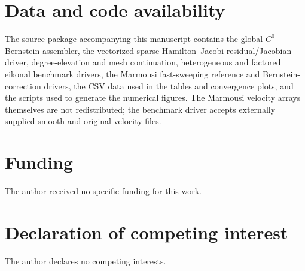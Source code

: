 \documentclass[preprint,12pt]{elsarticle}
\begin{document}
\section*{Data and code availability}
The source package accompanying this manuscript contains the global $C^0$ Bernstein assembler, the vectorized sparse Hamilton--Jacobi residual/Jacobian driver, degree-elevation and mesh continuation, heterogeneous and factored eikonal benchmark drivers, the Marmousi fast-sweeping reference and Bernstein-correction drivers, the CSV data used in the tables and convergence plots, and the scripts used to generate the numerical figures.  The Marmousi velocity arrays themselves are not redistributed; the benchmark driver accepts externally supplied smooth and original velocity files.

\section*{Funding}
The author received no specific funding for this work.

\section*{Declaration of competing interest}
The author declares no competing interests.
\end{document}
